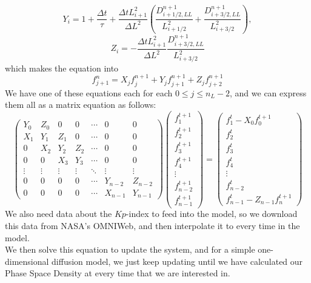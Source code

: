 \documentclass[a4paper, fleqn]{article}
\begin{document}
\[Y_i=1+\frac{\Delta t}{\tau}+\frac{\Delta t L_{i+1}^2}{\Delta L^2}\left(\frac{D_{i+1/2, LL}^{n+1}}{L_{i+1/2}^2}+\frac{D_{i+3/2, LL}^{n+1}}{L_{i+3/2}^2}\right),\]
\[Z_i=-\frac{\Delta t L_{i+1}^2}{\Delta L^2}\frac{D_{i+3/2, LL}^{n+1}}{L_{i+3/2}^2}\]
which makes the equation into
\[f_{j+1}^n = X_jf_j^{n+1} + Y_jf_{j+1}^{n+1} + Z_jf_{j+2}^{n+1}\]
We have one of these equations each for each $0 \leq j \leq n_L - 2$, and we can express them all as a matrix equation as follows:
\[\begin{pmatrix}
Y_0&Z_0&0&0&\cdots&0&0\\
X_1&Y_1&Z_1&0&\cdots&0&0\\
0&X_2&Y_2&Z_2&\cdots&0&0\\
0&0&X_3&Y_3&\cdots&0&0\\
\vdots&\vdots&\vdots&\vdots&\ddots&\vdots&\vdots\\
0&0&0&0&\cdots&Y_{n-2}&Z_{n-2}\\
0&0&0&0&\cdots&X_{n-1}&Y_{n-1}
\end{pmatrix}
\begin{pmatrix}f^{t+1}_1\\f^{t+1}_2\\f^{t+1}_3\\f^{t+1}_4\\\vdots\\f^{t+1}_{n-2}\\f^{t+1}_{n-1}\end{pmatrix}=\begin{pmatrix}f^t_1-X_0f_0^{t+1}\\f^t_2\\f^t_3\\f^t_4\\\vdots\\f^t_{n-2}\\f^t_{n-1}-Z_{n-1}f_n^{t+1}\end{pmatrix}\]
We also need data about the $Kp$-index to feed into the model, so we download this data from NASA's OMNIWeb, and then interpolate it to every time in the model.\\
We then solve this equation to update the system, and for a simple one-dimensional diffusion model, we just keep updating until we have calculated our Phase Space Density at every time that we are interested in.
\end{document}
